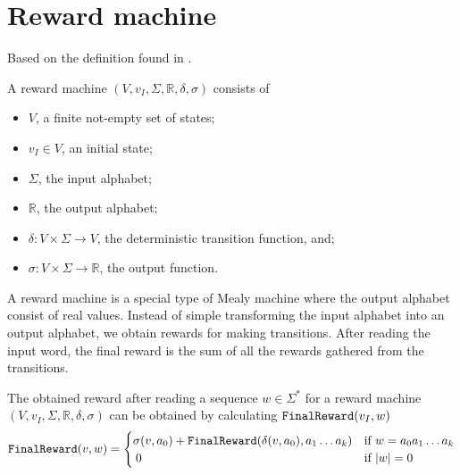 \section{Reward machine}
Based on the definition found in \cite{p:jirp}.
\begin{definition}
	A reward machine $(V,v_I,\Sigma,\mathbb{R},\delta,\sigma)$ consists of
	\begin{itemize}
		\item $V$, a finite not-empty set of states;
		\item $v_I\in V$, an initial state;
		\item $\Sigma$, the input alphabet;
		\item $\mathbb{R}$, the output alphabet;
		\item $\delta: V\times\Sigma\to V$, the deterministic transition function, and;
		\item $\sigma: V\times\Sigma\to \mathbb{R}$, the output function.
		\end{itemize}
\end{definition}
A reward machine is a special type of Mealy machine where the output alphabet consist of real values. Instead of simple transforming the input alphabet into an output alphabet, we obtain rewards for making transitions. After reading the input word, the final reward is the sum of all the rewards gathered from the transitions.

The obtained reward after reading a sequence $w\in\Sigma^*$ for a reward machine $(V,v_I,\Sigma,\mathbb{R},\delta,\sigma)$ can be obtained by calculating $\texttt{FinalReward}(v_I,w)$
\begin{equation*} 
	\texttt{FinalReward}(v, w) = 
\begin{cases}
	\sigma(v,a_0) + \texttt{FinalReward}(\delta(v,a_0),a_1\dots a_k) & \text{if }w=a_0 a_1 \dots a_k \\
	\: 0 & \text{if } |w|=0
\end{cases}
\end{equation*}
